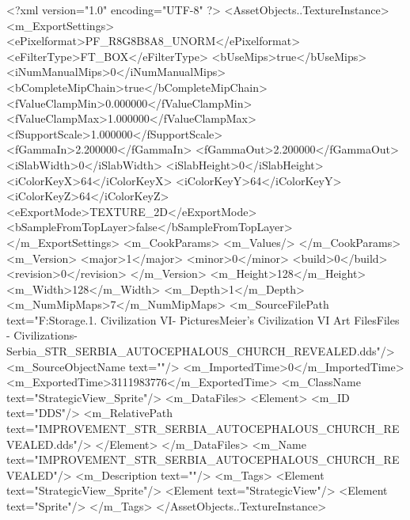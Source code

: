 <?xml version="1.0" encoding="UTF-8" ?>
<AssetObjects..TextureInstance>
	<m_ExportSettings>
		<ePixelformat>PF_R8G8B8A8_UNORM</ePixelformat>
		<eFilterType>FT_BOX</eFilterType>
		<bUseMips>true</bUseMips>
		<iNumManualMips>0</iNumManualMips>
		<bCompleteMipChain>true</bCompleteMipChain>
		<fValueClampMin>0.000000</fValueClampMin>
		<fValueClampMax>1.000000</fValueClampMax>
		<fSupportScale>1.000000</fSupportScale>
		<fGammaIn>2.200000</fGammaIn>
		<fGammaOut>2.200000</fGammaOut>
		<iSlabWidth>0</iSlabWidth>
		<iSlabHeight>0</iSlabHeight>
		<iColorKeyX>64</iColorKeyX>
		<iColorKeyY>64</iColorKeyY>
		<iColorKeyZ>64</iColorKeyZ>
		<eExportMode>TEXTURE_2D</eExportMode>
		<bSampleFromTopLayer>false</bSampleFromTopLayer>
	</m_ExportSettings>
	<m_CookParams>
		<m_Values/>
	</m_CookParams>
	<m_Version>
		<major>1</major>
		<minor>0</minor>
		<build>0</build>
		<revision>0</revision>
	</m_Version>
	<m_Height>128</m_Height>
	<m_Width>128</m_Width>
	<m_Depth>1</m_Depth>
	<m_NumMipMaps>7</m_NumMipMaps>
	<m_SourceFilePath text="F:\Mod Storage\2.1. Civilization VI\Mods\Archive - Pictures\Sid Meier's Civilization VI Art Files\Art Files - Civilizations\Civilization - Serbia\IMPROVEMENT_STR_SERBIA_AUTOCEPHALOUS_CHURCH_REVEALED.dds"/>
	<m_SourceObjectName text=""/>
	<m_ImportedTime>0</m_ImportedTime>
	<m_ExportedTime>3111983776</m_ExportedTime>
	<m_ClassName text="StrategicView_Sprite"/>
	<m_DataFiles>
		<Element>
			<m_ID text="DDS"/>
			<m_RelativePath text="IMPROVEMENT_STR_SERBIA_AUTOCEPHALOUS_CHURCH_REVEALED.dds"/>
		</Element>
	</m_DataFiles>
	<m_Name text="IMPROVEMENT_STR_SERBIA_AUTOCEPHALOUS_CHURCH_REVEALED"/>
	<m_Description text=""/>
	<m_Tags>
		<Element text="StrategicView_Sprite"/>
		<Element text="StrategicView"/>
		<Element text="Sprite"/>
	</m_Tags>
</AssetObjects..TextureInstance>

